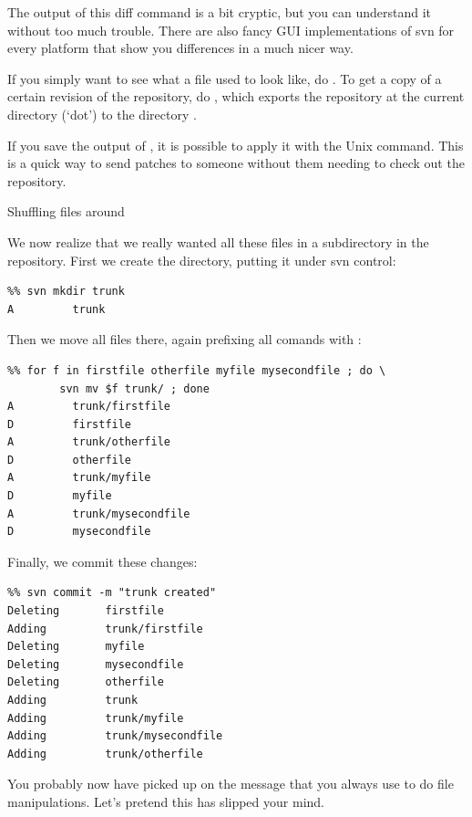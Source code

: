 The output of this diff command is a bit cryptic, but you can
understand it without too much trouble. There are also fancy GUI
implementations of svn for every platform that show you differences in
a much nicer way.

If you simply want to see what a file used to look like, do . To get a copy of a certain revision of the
repository, do , which exports the
repository at the current directory (`dot') to the directory .

If you save the output of , it is possible to apply it
with the Unix  command. This is a quick way to send patches
to someone without them needing to check out the repository.

 {Shuffling files around}

We now realize that we really wanted all these files in a subdirectory
in the repository. First we create the directory, putting it under svn control:
\begin{verbatim}
%% svn mkdir trunk
A         trunk
\end{verbatim}
Then we move all files there, again prefixing all comands with :
\begin{verbatim}
%% for f in firstfile otherfile myfile mysecondfile ; do \
        svn mv $f trunk/ ; done
A         trunk/firstfile
D         firstfile
A         trunk/otherfile
D         otherfile
A         trunk/myfile
D         myfile
A         trunk/mysecondfile
D         mysecondfile
\end{verbatim}
Finally, we commit these changes:
\begin{verbatim}
%% svn commit -m "trunk created"
Deleting       firstfile
Adding         trunk/firstfile
Deleting       myfile
Deleting       mysecondfile
Deleting       otherfile
Adding         trunk
Adding         trunk/myfile
Adding         trunk/mysecondfile
Adding         trunk/otherfile
\end{verbatim}

You probably now have picked up on the message that you always use
 to do file manipulations. Let's pretend this has slipped your
mind.


